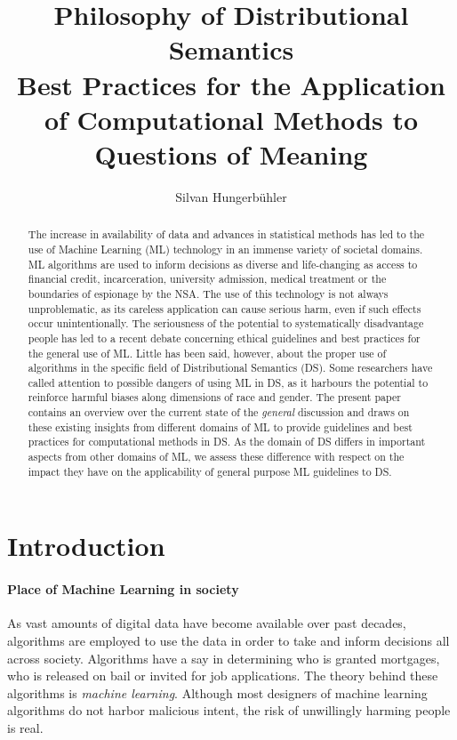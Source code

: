 \documentclass{article}
\title{Philosophy of Distributional Semantics\\
\large Best Practices for the Application of Computational Methods to Questions of Meaning}
\date{}
\author{Silvan Hungerb{\"u}hler}
\begin{document}
\maketitle
\begin{abstract}
The increase in availability of data and advances in statistical methods has led to the use of Machine Learning (ML) technology in an immense variety of societal domains. ML algorithms are used to inform decisions as diverse and life-changing as access to financial credit, incarceration, university admission, medical treatment or the boundaries of espionage by the NSA.
The use of this technology is not always unproblematic, as its careless application can cause serious harm, even if such effects occur unintentionally.
The seriousness of the potential to systematically disadvantage people has led to a recent debate concerning ethical guidelines and best practices for the general use of ML.
Little has been said, however, about the proper use of algorithms in the specific field of Distributional Semantics (DS). Some researchers have called attention to possible dangers of using ML in DS, as it harbours the potential to reinforce harmful biases along dimensions of race and gender.
The present paper contains an overview over the current state of the \emph{general} discussion 
and draws on these existing insights from different domains of ML to provide guidelines and best practices for computational methods in DS.
As the domain of DS differs in important aspects from other domains of ML, 
we assess these difference with respect on the impact they have on the applicability of general purpose ML guidelines to DS.
\end{abstract}
\section{Introduction}
\paragraph{Place of Machine Learning in society}
As vast amounts of digital data have become available over past decades, algorithms are employed to use the data in order to take and inform decisions all across society. 
Algorithms have a say in determining who is granted mortgages, who is released on bail or invited for job applications. 
\cite{algorithms2016}
The theory behind these algorithms is \emph{machine learning}.
Although most designers of machine learning algorithms do not harbor malicious intent, the risk of unwillingly harming people is real.
\end{document}
